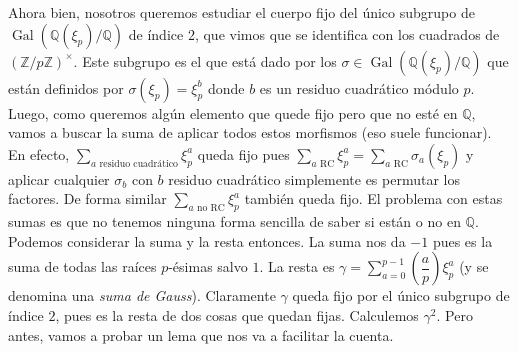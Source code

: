 \documentclass[12pt]{book}
\theoremstyle{definition}
\newcommand{\ZZ}{\mathbb{Z}}      %
\newcommand{\QQ}{\mathbb{Q}}
\DeclareMathOperator{\Gal}{Gal}
\begin{document}
Ahora bien, nosotros queremos estudiar el cuerpo fijo del único subgrupo de $\Gal(\QQ(\xi_p)/\QQ)$ de índice $2$, que vimos que se identifica con los cuadrados de $(\ZZ/p\ZZ)^\times$. Este subgrupo es el que está dado por los $\sigma\in\Gal(\QQ(\xi_p)/\QQ)$ que están definidos por $\sigma(\xi_p) = \xi_p^b$ donde $b$ es un residuo cuadrático módulo $p$. Luego, como queremos algún elemento que quede fijo pero que no esté en $\QQ$, vamos a buscar la suma de aplicar todos estos morfismos (eso suele funcionar). En efecto, $\displaystyle\sum_{a\text{ residuo cuadrático}} \xi_p^a$ queda fijo pues $\displaystyle\sum_{a\text{ RC}} \xi_p^a = \displaystyle\sum_{a\text{ RC}}\sigma_a(\xi_p)$ y aplicar cualquier $\sigma_b$ con $b$ residuo cuadrático simplemente es permutar los factores. De forma similar $\displaystyle\sum_{a \text{ no RC}}\xi_p^a$ también queda fijo. El problema con estas sumas es que no tenemos ninguna forma sencilla de saber si están o no en $\QQ$. Podemos considerar la suma y la resta entonces. La suma nos da $-1$ pues es la suma de todas las raíces $p$-ésimas salvo $1$. La resta es $\gamma = \displaystyle\sum_{a=0}^{p-1} \left(\dfrac{a}{p}\right)\xi_p^a$ (y se denomina una \textit{suma de Gauss}). Claramente $\gamma$ queda fijo por el único subgrupo de índice $2$, pues es la resta de dos cosas que quedan fijas. Calculemos $\gamma^2$. Pero antes, vamos a probar un lema que nos va a facilitar la cuenta.
\end{document}

